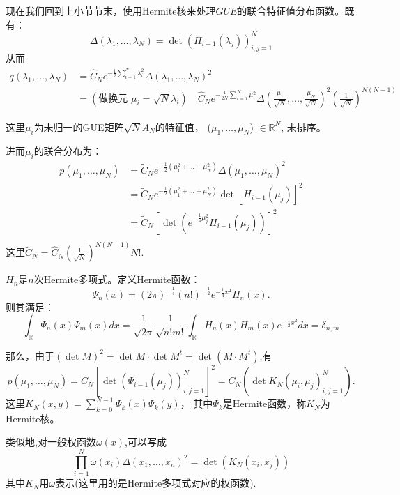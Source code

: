 现在我们回到上小节节末，使用Hermite核来处理$GUE$的联合特征值分布函数。既有：
$$\Delta (\lambda_1, \ldots, \lambda_N) = \det (H_{i-1} (\lambda_j))_{i,j=1}^N$$
从而
\begin{equation*}
    \begin{aligned}
        q(\lambda_1, \ldots, \lambda_N) &= \hat{C}_N e^{-\frac{1}{2} \sum\limits_{i=1}^N \lambda_i^2} \Delta (\lambda_1, \ldots, \lambda_N)^2\\
        &=(\text{做换元 }\mu_i=\sqrt{N}\lambda_i) \quad \hat{C}_N e^{-\frac{1}{2N} \sum\limits_{i=1}^N \mu_i^2} \Delta (\frac{\mu_1}{\sqrt{N}}, \ldots, \frac{\mu_N}{\sqrt{N}})^2 (\frac{1}{\sqrt{N}})^{N(N-1)}
    \end{aligned}
\end{equation*}


这里$\mu_i$为未归一的GUE矩阵$\sqrt{N} A_N$的特征值，
($\mu_1, \ldots, \mu_N$) $\in \mathbb{R}^N$, 未排序。

进而$\mu_i$的联合分布为：
\begin{equation*}
    \begin{aligned}
    p(\mu_1, \ldots, \mu_N) &= \tilde{C}_N e^{-\frac{1}{2} (\mu_1^2 + \ldots + \mu_N^2)} \Delta (\mu_1, \ldots, \mu_N)^2\\
    &=\tilde{C}_N e^{-\frac{1}{2} (\mu_1^2 + \ldots + \mu_N^2)} \det [H_{i-1} (\mu_j)]^2\\
    &=\tilde{C}_N [ \det (e^{-\frac{1}{4} \mu_j^2} H_{i-1} (\mu_j))]^2\\    
    \end{aligned}
\end{equation*}
这里$\tilde{C}_N = \hat{C}_N (\frac{1}{\sqrt{N}})^{N(N-1)} N!$.

\begin{definition}
    $H_n$是$n$次Hermite多项式。定义Hermite函数：
    \[\Psi_n(x) = (2\pi)^{-\frac{1}{4}} (n!)^{-\frac{1}{2}} e^{-\frac{1}{4}x^2} H_n(x).\]
    则其满足：
    \[\int_{\mathbb{R}} \Psi_n(x) \Psi_m(x) dx = \frac{1}{\sqrt{2\pi}} \frac{1}{\sqrt{n!m!}} \int_{\mathbb{R}} H_n(x) H_m(x) e^{-\frac{1}{2}x^2} dx=\delta_{n,m}\]
\end{definition}


那么，由于$(\det M)^2=\det M\cdot \det M^t=\det(M\cdot M^t)$,有
\[p(\mu_1, \ldots, \mu_N) = C_N [ \det (\Psi_{i-1} (\mu_j))_{i,j=1}^N ]^2=C_N (\det K_N(\mu_i, \mu_j)_{i,j=1}^N).\]
这里$K_N(x,y) = \sum\limits_{k=0}^{N-1} \Psi_k(x) \Psi_k(y)$，
其中$\Psi_k$是Hermite函数，称$K_N$为Hermite核。

类似地,对一般权函数$\omega(x)$,可以写成
$$\prod_{i=1}^N \omega(x_i) \Delta(x_1, \ldots, x_n)^2 = \det (K_N(x_i, x_j))$$
其中$K_N$用$\omega$表示(这里用的是Hermite多项式对应的权函数).

